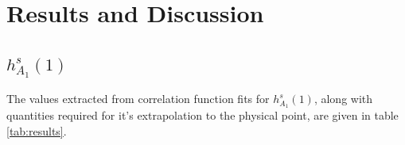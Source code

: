 \section{Results and Discussion}
\label{sec:results}

\subsection{$h^s_{A_1}(1)$}

The values extracted from correlation function fits for $h^s_{A_1}(1)$, along with quantities required for it's extrapolation to the physical point, are given in table \ref{tab:results}.


